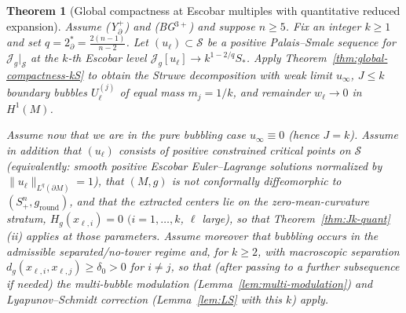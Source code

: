 \documentclass[11pt,reqno,a4paper]{amsart}
\numberwithin{equation}{section}
\theoremstyle{plain}
\newtheorem{theorem}{Theorem}[section]
\theoremstyle{remark}
\theoremstyle{plain}
\begin{document}
\begin{theorem}[Global compactness at Escobar multiples with quantitative reduced expansion]\label{thm:threshold-quant}
Assume \textup{(Y$^+_{\partial}$)} and \textup{(BG$^{3+}$)} and suppose $n\ge5$.
Fix an integer $k\ge1$ and set $q=2^*_{\partial}=\frac{2(n-1)}{n-2}$.
Let $(u_\ell)\subset\mathcal S$ be a positive Palais--Smale sequence for
$\mathcal J_g|_{\mathcal S}$ at the $k$-th Escobar level
$\mathcal J_g[u_\ell]\to k^{1-2/q}S_\ast$.  Apply
Theorem~\ref{thm:global-compactness-kS} to obtain the Struwe decomposition
with weak limit $u_\infty$, $J\le k$ boundary bubbles $U^{(j)}_\ell$ of
equal mass $m_j=1/k$, and remainder $w_\ell\to0$ in $H^1(M)$.

\smallskip
Assume now that we are in the \emph{pure bubbling} case $u_\infty\equiv0$ (hence $J=k$).
Assume in addition that $(u_\ell)$ consists of \emph{positive constrained critical points} on $\mathcal S$
(equivalently: smooth positive Escobar Euler--Lagrange solutions normalized by $\|u_\ell\|_{L^q(\partial M)}=1$),
that $(M,g)$ is not conformally diffeomorphic to $(S^n_+,g_{\mathrm{round}})$,
and that the extracted centers lie on the zero-mean-curvature stratum,
$H_g(x_{\ell,i})=0$ $(i=1,\dots,k$, $\ell$ large),
so that Theorem~\ref{thm:Jk-quant}\textup{(ii)} applies at those parameters.
Assume moreover that bubbling occurs in the admissible separated/no-tower regime and,
for $k\ge2$, with macroscopic separation $d_g(x_{\ell,i},x_{\ell,j})\ge\delta_0>0$ for $i\neq j$,
so that (after passing to a further subsequence if needed)
the multi-bubble modulation (Lemma~\ref{lem:multi-modulation}) and Lyapunov--Schmidt correction (Lemma~\ref{lem:LS} with this $k$) apply.


\end{theorem}
\end{document}
